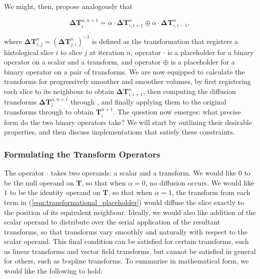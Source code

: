 	  We might, then, propose analogously that
		
		\begin{equation}
		 	\mathbf{\Delta T}_i^{n,n+1} = \alpha \cdot \mathbf{\Delta T}_{i,i+1}^n \oplus \alpha \cdot \mathbf{\Delta T}_{i,i-1}^n, \label{eqn:transformational_placeholder}
		\end{equation}
	 	
	 	where $\mathbf{\Delta T}_{i,j}^n = (\mathbf{\Delta T}_{j,i}^n)^{-1}$ is defined as the transformation that registers a histological slice $i$ to slice $j$ at iteration $n$, operator $\cdot$ is a placeholder for a binary operator on a scalar and a transform, and operator $\oplus$ is a placeholder for a binary operator on a pair of transforms. We are now equipped to calculate the transforms for progressively smoother and smoother volumes, by first registering each slice to its neighbour to obtain $\mathbf{\Delta T}_{i,i+1}^n$, then computing the diffusion transforms $\mathbf{\Delta T}_i^{n,n+1}$ through , and finally applying them to the original transforms through  to obtain $\mathbf{T}_i^{n+1}$. The question now emerges: what precise form do the two binary operators take? We will start by outlining their desirable properties, and then discuss implementations that satisfy these constraints.
		
    \subsubsection{Formulating the Transform Operators} %
    \label{ssub:formulating_the_transform_operators}
		The operator $\cdot$ takes two operands: a scalar and a transform. We would like $0$ to be the null operand on $\mathbf{T}$, so that when $\alpha = 0$, no diffusion occurs. We would like $1$ to be the identity operand on $\mathbf{T}$, so that when $\alpha = 1$, the transform from each term in (\ref{eqn:transformational_placeholder}) would diffuse the slice exactly to the position of its equivalent neighbour. Ideally, we would also like addition of the scalar operand to distribute over the serial application of the resultant transforms, so that transforms vary smoothly and naturally with respect to the scalar operand. This final condition can be satisfied for certain transforms, such as linear transforms and vector field transforms, but cannot be satisfied in general for others, such as b-spline transforms. To summarise in mathematical form, we would like the following to hold:
		
